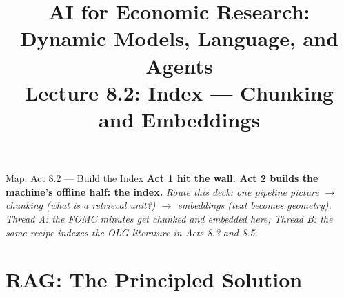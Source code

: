 


\usetikzlibrary{arrows.meta, positioning, shapes, shapes.geometric, fit, calc, backgrounds}

\graphicspath{{./pic/}{./figures/}{../../MiniCourse_8hr/Slides/Module4_Agentic_AI/pic/}{../}}



\title[AI for Econ Research]{AI for Economic Research: Dynamic Models, Language, and Agents\\
Lecture 8.2: Index --- Chunking and Embeddings}



\makebeamertitle

\begin{frame}{Map: Act 8.2 --- Build the Index}
\textbf{Act 1 hit the wall. Act 2 builds the machine's offline half: the index.}
\textit{\footnotesize Route this deck: one pipeline picture $\to$ chunking (what is a retrieval unit?) $\to$ embeddings (text becomes geometry).
Thread A: the FOMC minutes get chunked and embedded here; Thread B: the same recipe indexes the OLG literature in Acts 8.3 and 8.5.}
\end{frame}

\section{RAG: The Principled Solution}

